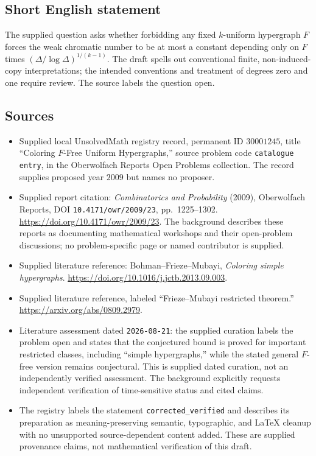 \documentclass[11pt]{article}
\begin{document}
\subsection{Short English statement}
The supplied question asks whether forbidding any fixed \(k\)-uniform hypergraph \(F\) forces the weak chromatic number to be at most a constant depending only on \(F\) times \((\Delta/\log\Delta)^{1/(k-1)}\). The draft spells out conventional finite, non-induced-copy interpretations; the intended conventions and treatment of degrees zero and one require review. The source labels the question open.
\subsection{Sources}
\begin{itemize}
\item Supplied local UnsolvedMath registry record, permanent ID \(30001245\), title ``Coloring \(F\)-Free Uniform Hypergraphs,'' source problem code \texttt{catalogue entry}, in the Oberwolfach Reports Open Problems collection. The record supplies proposed year \(2009\) but names no proposer.
\item Supplied report citation: \emph{Combinatorics and Probability} (2009), Oberwolfach Reports, DOI \texttt{10.4171/owr/2009/23}, pp.~1225--1302. \url{https://doi.org/10.4171/owr/2009/23}. The background describes these reports as documenting mathematical workshops and their open-problem discussions; no problem-specific page or named contributor is supplied.
\item Supplied literature reference: Bohman--Frieze--Mubayi, \emph{Coloring simple hypergraphs}. \url{https://doi.org/10.1016/j.jctb.2013.09.003}.
\item Supplied literature reference, labeled ``Frieze--Mubayi restricted theorem.'' \url{https://arxiv.org/abs/0809.2979}.
\item Literature assessment dated \texttt{2026-08-21}: the supplied curation labels the problem open and states that the conjectured bound is proved for important restricted classes, including ``simple hypergraphs,'' while the stated general \(F\)-free version remains conjectural. This is supplied dated curation, not an independently verified assessment. The background explicitly requests independent verification of time-sensitive status and cited claims.
\item The registry labels the statement \texttt{corrected\_verified} and describes its preparation as meaning-preserving semantic, typographic, and LaTeX cleanup with no unsupported source-dependent content added. These are supplied provenance claims, not mathematical verification of this draft.
\end{itemize}
\end{document}
